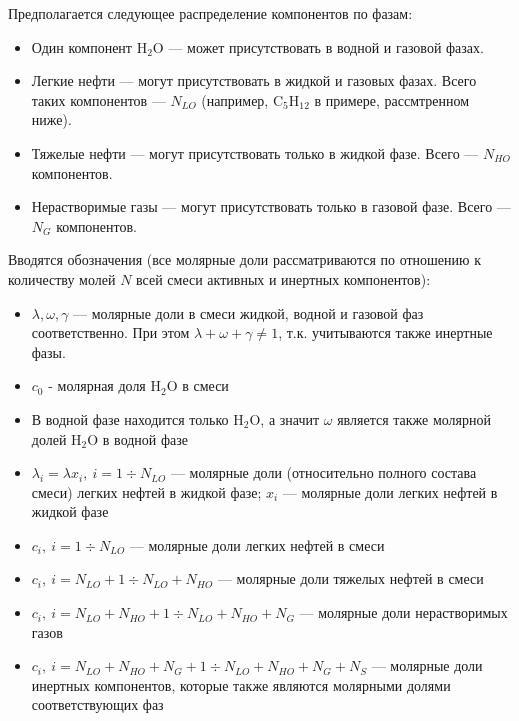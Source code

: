 \documentclass[12pt]{article}
\let\dividesymbol\div
\renewcommand{\div}{\operatorname{div}}
\begin{document}
Предполагается следующее распределение компонентов по фазам:
\begin{itemize}
\item Один компонент $\mathrm{H_2O}$ --- может присутствовать в водной и газовой фазах.
\item Легкие нефти --- могут присутствовать в жидкой и газовых фазах. Всего таких компонентов --- $N_{LO}$ (например, $\mathrm{C_5H_{12}}$ в примере, рассмтренном ниже).
\item Тяжелые нефти --- могут присутствовать только в жидкой фазе. Всего --- $N_{HO}$ компонентов.
\item Нерастворимые газы --- могут присутствовать только в газовой фазе. Всего --- $N_{G}$ компонентов.
\end{itemize}

Вводятся обозначения (все молярные доли рассматриваются по отношению к количеству молей $N$ всей смеси активных и инертных компонентов):
\begin{itemize}
\item $\lambda, \omega, \gamma$ --- молярные доли в смеси жидкой, водной и газовой фаз соответственно. При этом $\lambda + \omega + \gamma \ne 1$, т.к. учитываются также инертные фазы.
\item $c_0$ - молярная доля $\mathrm{H_2O}$ в смеси
\item В водной фазе находится только $\mathrm{H_2O}$, а значит $\omega$ является также молярной долей $\mathrm{H_2O}$ в водной фазе
\item $\lambda_i = \lambda x_i, \: i = 1 \dividesymbol N_{LO}$ --- молярные доли (относительно полного состава смеси) легких нефтей в жидкой фазе; $x_i$ --- молярные доли легких нефтей в жидкой фазе
\item $c_i, \: i = 1 \dividesymbol N_{LO}$ --- молярные доли легких нефтей в смеси
\item $c_i, \: i = N_{LO} + 1 \dividesymbol N_{LO} + N_{HO}$ --- молярные доли тяжелых нефтей в смеси
\item $c_i, \: i = N_{LO} + N_{HO} + 1 \dividesymbol N_{LO} + N_{HO} + N_G$ --- молярные доли нерастворимых газов
\item $c_i, \: i = N_{LO} + N_{HO} + N_G + 1 \dividesymbol N_{LO} + N_{HO} + N_G + N_S$ --- молярные доли инертных компонентов, которые также являются молярными долями соответствующих фаз

\end{itemize}
\end{document}
